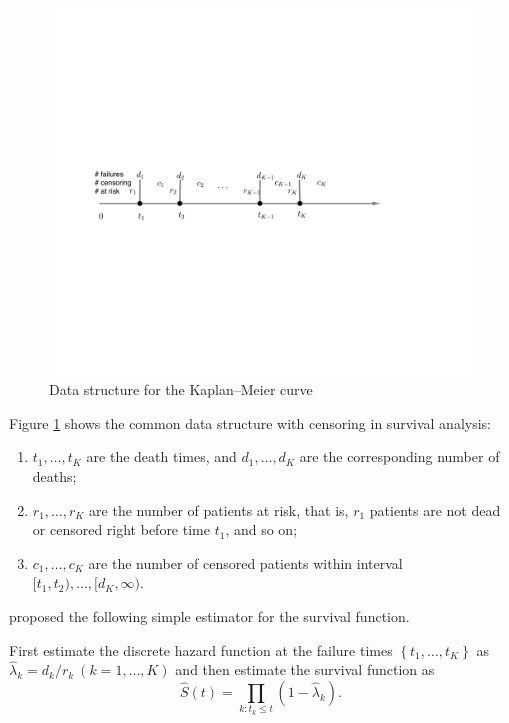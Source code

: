 \begin{figure}
\centering
\includegraphics[width = \textwidth]{figures/kmcurvedata}
\caption{Data structure for the Kaplan--Meier curve}\label{fig::kmcurve-data}
\end{figure}

Figure \ref{fig::kmcurve-data} shows the common data structure with censoring in survival analysis:
\begin{enumerate}
[(S1)]
\item
$t_1,\ldots, t_K$ are the death times, and $d_1,\ldots, d_K$ are the corresponding number of deaths;

\item
$r_1, \ldots, r_K$ are the number of patients at risk, that is, $r_1$ patients are not dead or censored right before time $t_1$, and so on;

\item
$c_1,\ldots, c_K$ are the number of censored patients within interval $[t_1, t_2 ) ,\ldots, [d_K, \infty)$.
\end{enumerate}


\citet{kaplan1958nonparametric} proposed the following simple estimator for the survival function.

\begin{definition}
\label{def::km-curve}
First estimate the discrete hazard function at the failure times $\left\{ t_{1},\ldots,t_{K}\right\} $
as $\hat{\lambda}_{k}=d_{k}/r_{k}\ (k=1,\ldots,K)$ and then estimate the survival
function as
\[
\hat{S}(t)=\prod_{k:t_{k}\leq t}(1-\hat{\lambda}_{k}).
\]
\end{definition}


